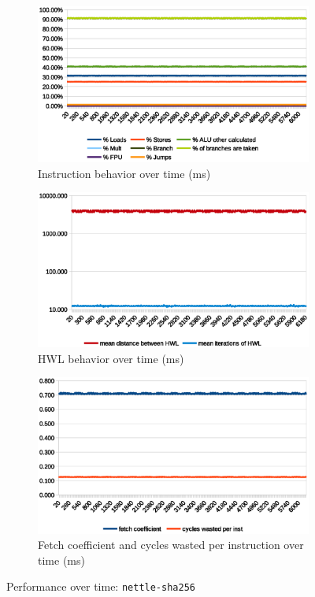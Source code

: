 \documentclass[../bachelor_paper.tex]{subfiles}
\begin{document}
\begin{figure}
    \begin{subfigure}{0.45\textwidth}
        \includegraphics[width=\textwidth]{img/graph/embench/nettle-sha256_inst.eps}
        \caption{Instruction behavior over time (ms)}
    \end{subfigure}
    \begin{subfigure}{0.45\textwidth}
        \includegraphics[width=\textwidth]{img/graph/embench/nettle-sha256_hwl.eps}
        \caption{\ac{HWL} behavior over time (ms)}
    \end{subfigure}
    \begin{subfigure}{0.45\textwidth}
        \includegraphics[width=\textwidth]{img/graph/embench/nettle-sha256_fetch_waste.eps}
        \caption{Fetch coefficient and cycles wasted per instruction over time (ms)}
    \end{subfigure}
    \caption{Performance over time: \texttt{nettle-sha256}}
\end{figure}
\end{document}
